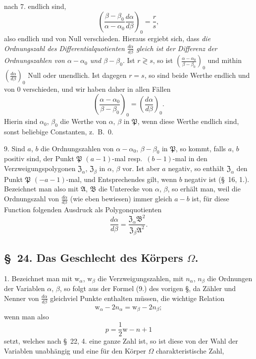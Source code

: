 \documentclass{article}
\begin{document}
nach 7. endlich sind,
\[ \left(\frac{\beta-\beta_{0}}{\alpha-\alpha_{0}}\frac{d\alpha}{d\beta}\right)_{0} = \frac{r}{s}, \tag{7.} \]
also endlich und von Null verschieden. Hieraus ergiebt sich, dass \emph{die Ordnungszahl des Differentialquotienten $\frac{d\alpha}{d\beta}$ gleich ist der Differenz der Ordnungszahlen von $\alpha-\alpha_{0}$ und $\beta-\beta_{0}$}. Ist $r \gtrless s$, so ist $\left(\frac{\alpha-\alpha_{0}}{\beta-\beta_{0}}\right)_{0}$ und mithin $\left(\frac{d\alpha}{d\beta}\right)_{0}$ Null oder unendlich. Ist dagegen $r = s$, so sind beide Werthe endlich und von 0 verschieden, und wir haben daher in allen Fällen
\[ \left(\frac{\alpha-\alpha_{0}}{\beta-\beta_{0}}\right)_{0} = \left(\frac{d\alpha}{d\beta}\right)_{0}. \tag{8.} \]
Hierin sind $\alpha_{0}$, $\beta_{0}$ die Werthe von $\alpha$, $\beta$ in $\mathfrak{P}$, wenn diese Werthe endlich sind, sonst beliebige Constanten, z.\ B.\ 0.

9. Sind $a$, $b$ die Ordnungszahlen von $\alpha-\alpha_{0}$, $\beta-\beta_{0}$ in $\mathfrak{P}$, so kommt, falls $a$, $b$ positiv sind, der Punkt $\mathfrak{P}$ $(a-1)$-mal resp.\ $(b-1)$-mal in den Verzweigungspolygonen $\mathfrak{Z}_{\alpha}$, $\mathfrak{Z}_{\beta}$ in $\alpha$, $\beta$ vor. Ist aber $a$ negativ, so enthält $\mathfrak{Z}_{\alpha}$ den Punkt $\mathfrak{P}$ $(-a-1)$-mal, und Entsprechendes gilt, wenn $b$ negativ ist (§~16, 1.). Bezeichnet man also mit $\mathfrak{A}$, $\mathfrak{B}$ die Unterecke von $\alpha$, $\beta$, so erhält man, weil die Ordnungszahl von $\frac{d\alpha}{d\beta}$ (wie eben bewiesen) immer gleich $a-b$ ist, für diese Function folgenden Ausdruck als Polygonquotienten
\[ \frac{d\alpha}{d\beta} = \frac{\mathfrak{Z}_{\alpha}\mathfrak{B}^{2}}{\mathfrak{Z}_{\beta}\mathfrak{A}^{2}}. \tag{9.} \]

\subsection*{§~24. Das Geschlecht des Körpers $\Omega$.}

1. Bezeichnet man mit $\mathrm{w}_{\alpha}$, $\mathrm{w}_{\beta}$ die Verzweigungszahlen, mit $n_{\alpha}$, $n_{\beta}$ die Ordnungen der Variablen $\alpha$, $\beta$, so folgt aus der Formel (9.) des vorigen §, da Zähler und Nenner von $\frac{d\alpha}{d\beta}$ gleichviel Punkte enthalten müssen, die wichtige Relation
\[ \mathrm{w}_{\alpha} - 2n_{\alpha} = \mathrm{w}_{\beta} - 2n_{\beta}; \]
wenn man also
\[ p = \frac{1}{2}\mathrm{w} - n + 1 \tag{1.} \]
setzt, welches nach §~22, 4. eine ganze Zahl ist, so ist diese von der Wahl der Variablen unabhängig und eine für den Körper $\Omega$ charakteristische Zahl,
\end{document}

